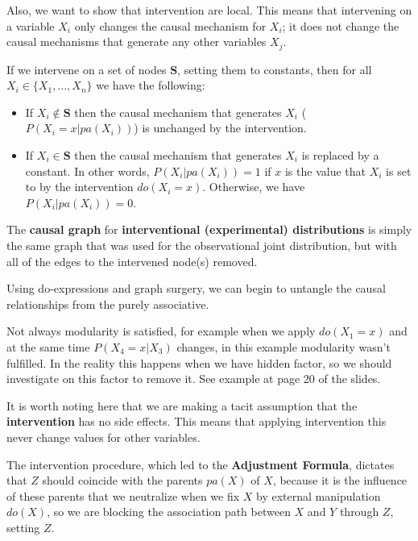 Also, we want to show that intervention are local. This means that intervening on
a variable $X_i$ only changes the causal mechanism for $X_i$; it does not change
the causal mechanisms that generate any other variables $X_j$.
\begin{definition}
      If we intervene on a set of nodes $\mathbf{S}$, setting them to constants,
      then for all $X_i \in \{X_1, \ldots, X_n\}$ we have the following:
      \begin{itemize}
            \item If $X_i \notin \mathbf{S}$ then the causal mechanism that generates
                  $X_i$ ($P(X_i = x | pa(X_i))$) is unchanged by the intervention.
            \item If $X_i \in \mathbf{S}$ then the causal mechanism that generates
                  $X_i$ is replaced by a constant. In other words, $P(X_i | pa(X_i)) = 1$
                  if $x$ is the value that $X_i$ is set to by the intervention
                  $do(X_i = x)$. Otherwise, we have $P(X_i | pa(X_i)) = 0$.
      \end{itemize}
\end{definition}
\begin{note}
      The \textbf{causal graph} for \textbf{interventional (experimental) distributions}
      is simply the same graph that was used for the observational joint distribution,
      but with all of the edges to the intervened node(s) removed.
\end{note}
Using do-expressions and graph surgery, we can begin to untangle the causal
relationships from the purely associative.

Not always modularity is satisfied, for example when we apply $do(X_1 = x)$
and at the same time $P(X_4 = x| X_3)$ changes, in this example modularity wasn't
fulfilled. In the reality this happens when we have hidden factor, so we should
investigate on this factor to remove it. See example at page 20 of the slides.

\begin{note}
      It is worth noting here that we are making a tacit assumption that the
      \textbf{intervention} has no side effects. This means that applying
      intervention this never change values for other variables.
\end{note}

The intervention procedure, which led to the \textbf{Adjustment Formula}, dictates
that $Z$ should coincide with the parents $pa(X)$ of $X$, because it is the
influence of these parents that we neutralize when we fix $X$ by external manipulation
$do(X)$, so we are blocking the association path between $X$ and $Y$ through $Z$,
setting $Z$.

